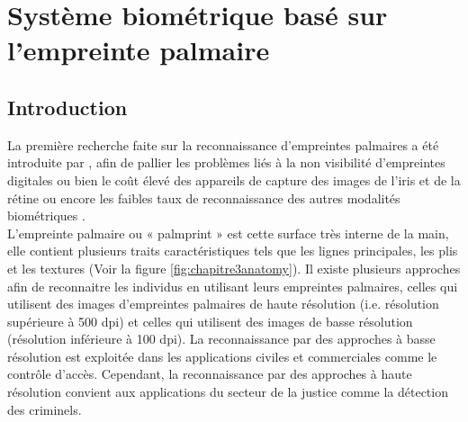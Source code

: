 \chapter{Système biométrique basé sur l'empreinte palmaire }
\label{Chapter3}
\section{Introduction}
\tab La première recherche faite sur la reconnaissance d'empreintes palmaires a été introduite par \citep{shu1998automated}, afin de pallier les problèmes liés à la non visibilité d'empreintes digitales ou bien le coût élevé des appareils de capture des images de l'iris et de la rétine ou encore les faibles taux de reconnaissance des autres modalités biométriques \citep{Wassila2007}.
\\L'empreinte palmaire ou « palmprint » est cette surface très interne de la main, elle contient plusieurs traits caractéristiques tels que les lignes principales, les plis et les textures \citep{pavevsic2004personal} (Voir la figure \ref{fig:chapitre3anatomy}). Il existe plusieurs approches afin de reconnaitre les individus en utilisant leurs empreintes palmaires, celles qui utilisent des images d'empreintes palmaires de haute résolution (i.e. résolution supérieure à 500 dpi) et celles qui utilisent des images de basse résolution (résolution inférieure à 100 dpi). La reconnaissance par des approches à basse résolution est exploitée dans les applications civiles et commerciales comme le contrôle d'accès. Cependant, la reconnaissance par des approches à haute résolution convient aux applications du secteur de la justice comme la détection des criminels.

